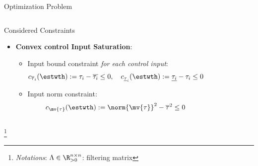 \documentclass[8pt, aspectratio=169, handout]{beamer}
\begin{document}
\begin{frame}{\insertsubsectionhead}{Optimization Problem}
\begin{columns}
{\begin{block}{Considered Constraints}
\begin{itemize}
        \item \textbf{Convex control Input Saturation}: 
          \begin{itemize}
            \item Input bound constraint \textit{for each control input}:
            \begin{equation}\label{eq:cstr:input_bound}
              c_{\overline{\tau}_i}(\estwth)
              :=
              \tau_i - \overline{\tau_i}
              \le 
              0
              ,
              \quad
              c_{\underline{\tau}_i}(\estwth)
              :=
              \underline{\tau_i} - \tau_i
              \le 
              0
            \end{equation}
            \item Input norm constraint:
            \begin{equation}\label{eq:cstr:input_norm}
              c_{\mv{\tau}}(\estwth)
              :=
              \norm{\mv{\tau}}^2 - \overline{\tau}^2
              \le
              0
            \end{equation}
        \end{itemize}
      \end{itemize}
      
    \end{block}
  }

  \end{columns}

  \let\thefootnote\relax\footnote{
    \textit{Notations}: 
    $\Lambda\in\R_{>0}^{n\times n}$: filtering matrix
  }

\end{frame}
\end{document}
